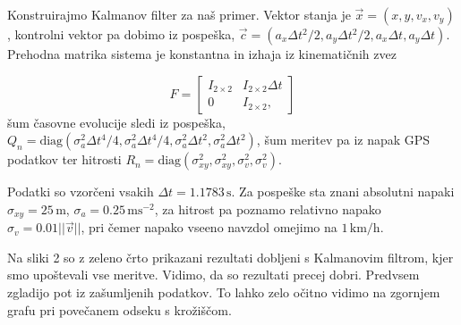 \documentclass[slovene,11pt,a4paper]{article}
\begin{document}
Konstruirajmo Kalmanov filter za naš primer. Vektor stanja je $\vec{x} = (x,y,v_x,v_y)$, kontrolni vektor pa dobimo iz pospeška, $\vec{c} = (a_x \Delta t^2 / 2, a_y \Delta t^2 / 2, a_x \Delta t, a_y \Delta t)$. Prehodna matrika sistema je konstantna in izhaja iz kinematičnih zvez

\[ F = 
\begin{bmatrix}
 I_{2\times 2} & I_{2\times 2}\Delta t \\
 0 & I_{2\times 2},
\end{bmatrix}
\]
šum časovne evolucije sledi iz pospeška, $Q_n = \text{diag}(\sigma_a^2 \Delta t^4 / 4, \sigma_a^2 \Delta t^4 / 4, \sigma_a^2 \Delta t^2, \sigma_a^2 \Delta t^2)$, šum meritev pa iz napak GPS podatkov ter hitrosti $R_n = \text{diag}(\sigma_{xy}^2,\sigma_{xy}^2, \sigma_{v}^2, \sigma_{v}^2)$.

Podatki so vzorčeni vsakih $\Delta t = 1.1783 \, \text{s}$. Za pospeške sta znani absolutni napaki $\sigma_{xy} = 25 \, \text{m}$, $\sigma_a = 0.25 \, \text{ms}^{-2}$, za hitrost pa poznamo relativno napako $\sigma_v = 0.01||\vec{v}||$, pri čemer napako vseeno navzdol omejimo na $1 \, \text{km/h}$.

Na sliki 2 so z zeleno črto prikazani rezultati dobljeni s Kalmanovim filtrom, kjer smo upoštevali vse meritve. Vidimo, da so rezultati precej dobri. Predvsem zgladijo pot iz zašumljenih podatkov. To lahko zelo očitno vidimo na zgornjem grafu pri povečanem odseku s krožiščom.
\end{document}
